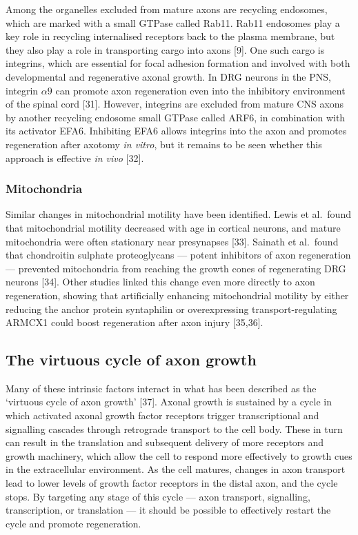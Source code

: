 \documentclass[
  12pt,
  a4paper,
]{book}
\begin{document}
Among the organelles excluded from mature axons are recycling endosomes, which are marked with a small GTPase called Rab11. Rab11 endosomes play a key role in recycling internalised receptors back to the plasma membrane, but they also play a role in transporting cargo into axons {[}9{]}. One such cargo is integrins, which are essential for focal adhesion formation and involved with both developmental and regenerative axonal growth. In DRG neurons in the PNS, integrin \(\alpha9\) can promote axon regeneration even into the inhibitory environment of the spinal cord {[}31{]}. However, integrins are excluded from mature CNS axons by another recycling endosome small GTPase called ARF6, in combination with its activator EFA6. Inhibiting EFA6 allows integrins into the axon and promotes regeneration after axotomy \emph{in vitro}, but it remains to be seen whether this approach is effective \emph{in vivo} {[}32{]}.

\hypertarget{mitochondria}{%
\subsubsection{Mitochondria}\label{mitochondria}}

Similar changes in mitochondrial motility have been identified. Lewis et al.~found that mitochondrial motility decreased with age in cortical neurons, and mature mitochondria were often stationary near presynapses {[}33{]}. Sainath et al.~found that chondroitin sulphate proteoglycans --- potent inhibitors of axon regeneration --- prevented mitochondria from reaching the growth cones of regenerating DRG neurons {[}34{]}. Other studies linked this change even more directly to axon regeneration, showing that artificially enhancing mitochondrial motility by either reducing the anchor protein syntaphilin or overexpressing transport-regulating ARMCX1 could boost regeneration after axon injury {[}35,36{]}.

\hypertarget{the-virtuous-cycle-of-axon-growth}{%
\subsection{The virtuous cycle of axon growth}\label{the-virtuous-cycle-of-axon-growth}}

Many of these intrinsic factors interact in what has been described as the `virtuous cycle of axon growth' {[}37{]}. Axonal growth is sustained by a cycle in which activated axonal growth factor receptors trigger transcriptional and signalling cascades through retrograde transport to the cell body. These in turn can result in the translation and subsequent delivery of more receptors and growth machinery, which allow the cell to respond more effectively to growth cues in the extracellular environment. As the cell matures, changes in axon transport lead to lower levels of growth factor receptors in the distal axon, and the cycle stops. By targeting any stage of this cycle --- axon transport, signalling, transcription, or translation --- it should be possible to effectively restart the cycle and promote regeneration.
\end{document}
